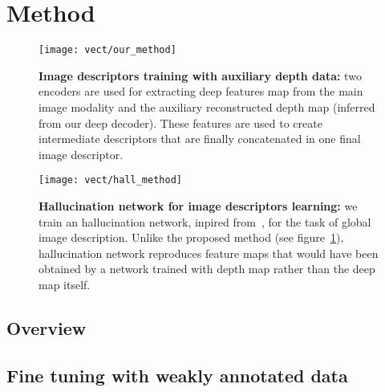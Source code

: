 \section{Method}
\label{sec:method}

\begin{figure}
	\center
	\texttt{[image: vect/our\_method]}
	\caption{\label{fig:our_method} \textbf{Image descriptors training with auxiliary depth data:} two encoders are used for extracting deep features map from the main image modality and the auxiliary reconstructed depth map (inferred from our deep decoder). These features are used to create intermediate descriptors that are finally concatenated in one final image descriptor.}
\end{figure}

\begin{figure}
	\center
	\texttt{[image: vect/hall\_method]}
	\caption{\label{fig:hall_method} \textbf{Hallucination network for image descriptors learning:} we train an hallucination network, inpired from~\cite{Hoffman2016}, for the task of global image description. Unlike the proposed method (see figure~\ref{fig:our_method}), hallucination network reproduces feature maps that would have been obtained by a network trained with depth map rather than the deep map itself.}
\end{figure}



\subsection{Overview}
\label{subsec:overview}	

\subsection{Fine tuning with weakly annotated data}
\label{subsec:data}


